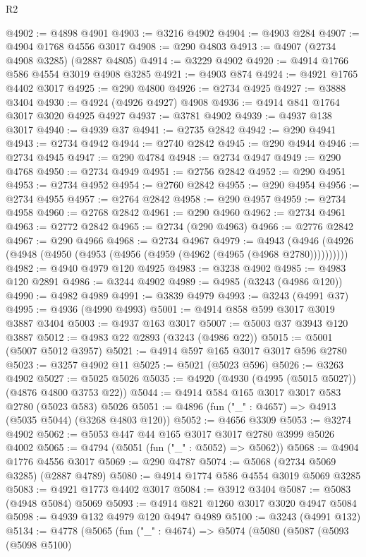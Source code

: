 \begin{lexlean}{R2}
\begin{coremodule}
@4902 := @4898 @4901
@4903 := @3216 @4902
@4904 := @4903 @284
@4907 := @4904 @1768 @4556 @3017
@4908 := @290 @4803
@4913 := @4907 (@2734 @4908 @3285) (@2887 @4805)
@4914 := @3229 @4902
@4920 := @4914 @1766 @586 @4554 @3019 @4908 @3285
@4921 := @4903 @874
@4924 := @4921 @1765 @4402 @3017
@4925 := @290 @4800
@4926 := @2734 @4925
@4927 := @3888 @3404
@4930 := @4924 (@4926 @4927) @4908
@4936 := @4914 @841 @1764 @3017 @3020 @4925 @4927
@4937 := @3781 @4902
@4939 := @4937 @138 @3017
@4940 := @4939 @37
@4941 := @2735 @2842
@4942 := @290 @4941
@4943 := @2734 @4942
@4944 := @2740 @2842
@4945 := @290 @4944
@4946 := @2734 @4945
@4947 := @290 @4784
@4948 := @2734 @4947
@4949 := @290 @4768
@4950 := @2734 @4949
@4951 := @2756 @2842
@4952 := @290 @4951
@4953 := @2734 @4952
@4954 := @2760 @2842
@4955 := @290 @4954
@4956 := @2734 @4955
@4957 := @2764 @2842
@4958 := @290 @4957
@4959 := @2734 @4958
@4960 := @2768 @2842
@4961 := @290 @4960
@4962 := @2734 @4961
@4963 := @2772 @2842
@4965 := @2734 (@290 @4963)
@4966 := @2776 @2842
@4967 := @290 @4966
@4968 := @2734 @4967
@4979 := @4943 (@4946 (@4926 (@4948 (@4950 (@4953 (@4956 (@4959 (@4962 (@4965 (@4968 @2780))))))))))
@4982 := @4940 @4979 @120 @4925
@4983 := @3238 @4902
@4985 := @4983 @120 @2891
@4986 := @3244 @4902
@4989 := @4985 (@3243 (@4986 @120))
@4990 := @4982 @4989
@4991 := @3839 @4979
@4993 := @3243 (@4991 @37)
@4995 := @4936 (@4990 @4993)
@5001 := @4914 @858 @599 @3017 @3019 @3887 @3404
@5003 := @4937 @163 @3017
@5007 := @5003 @37 @3943 @120 @3887
@5012 := @4983 @22 @2893 (@3243 (@4986 @22))
@5015 := @5001 (@5007 @5012 @3957)
@5021 := @4914 @597 @165 @3017 @3017 @596 @2780
@5023 := @3257 @4902 @11
@5025 := @5021 (@5023 @596)
@5026 := @3263 @4902
@5027 := @5025 @5026
@5035 := @4920 (@4930 (@4995 (@5015 @5027)) (@4876 @4800 @3753 @22))
@5044 := @4914 @584 @165 @3017 @3017 @583 @2780 (@5023 @583) @5026
@5051 := @4896 (fun ("_" : @4657) => @4913 (@5035 @5044) (@3268 @4803 @120))
@5052 := @4656 @3309
@5053 := @3274 @4902
@5062 := @5053 @447 @44 @165 @3017 @3017 @2780 @3999 @5026 @4002
@5065 := @4794 (@5051 (fun ("_" : @5052) => @5062))
@5068 := @4904 @1776 @4556 @3017
@5069 := @290 @4787
@5074 := @5068 (@2734 @5069 @3285) (@2887 @4789)
@5080 := @4914 @1774 @586 @4554 @3019 @5069 @3285
@5083 := @4921 @1773 @4402 @3017
@5084 := @3912 @3404
@5087 := @5083 (@4948 @5084) @5069
@5093 := @4914 @821 @1260 @3017 @3020 @4947 @5084
@5098 := @4939 @132 @4979 @120 @4947 @4989
@5100 := @3243 (@4991 @132)
@5134 := @4778
    (@5065
      (fun ("_" : @4674) =>
      @5074
        (@5080
          (@5087
            (@5093
              (@5098 @5100)

\end{coremodule}
\end{lexlean}
